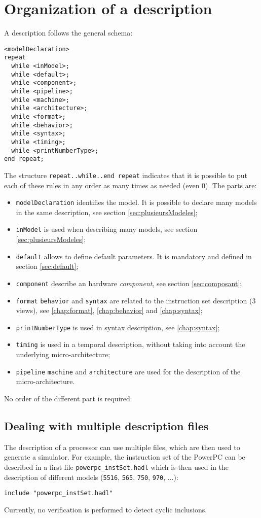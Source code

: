 \section{Organization of a description}
A description follows the general schema:
\begin{verbatim}
<modelDeclaration> 
repeat 
  while <inModel>; 
  while <default>; 
  while <component>; 
  while <pipeline>; 
  while <machine>; 
  while <architecture>; 
  while <format>; 
  while <behavior>; 
  while <syntax>; 
  while <timing>; 
  while <printNumberType>; 
end repeat;
\end{verbatim}
The structure \texttt{repeat..while..end repeat} indicates that it is possible to put each of these rules in any order as many times as needed (even 0).
The parts are:
\begin{itemize}
\item \texttt{modelDeclaration} identifies the model. It is possible to declare many models in the same description, see section \ref{sec:plusieursModeles};
\item \texttt{inModel} is used when describing many models, see section \ref{sec:plusieursModeles};
\item \texttt{default} allows to define default parameters. It is mandatory and defined in section \ref{sec:default};
\item \texttt{component}  describe an hardware \emph{component}, see section \ref{sec:composant};
\item \texttt{format} \texttt{behavior} and \texttt{syntax} are related to the instruction set description (3 views), see \ref{chap:format},  \ref{chap:behavior} and  \ref{chap:syntax};
\item \texttt{printNumberType} is used in syntax description, see \ref{chap:syntax};
\item \texttt{timing} is used in a temporal description, without taking into account the underlying micro-architecture;
\item \texttt{pipeline} \texttt{machine} and \texttt{architecture} are used for the description of the micro-architecture.
\end{itemize}
No order of the different part is required.

\subsection{Dealing with multiple description files}
\label{sec:plusieursFichiers}
The description of a processor can use multiple files, which are then used to generate a simulator. 
For example, the instruction set of the PowerPC can be described in a first file \texttt{powerpc\_instSet.hadl} which is then used in the description of different models (\texttt{5516}, \texttt{565}, \texttt{750}, \texttt{970}, ...):
\begin{lstlisting}
include "powerpc_instSet.hadl"
\end{lstlisting}
Currently, no verification is performed to detect cyclic inclusions.

